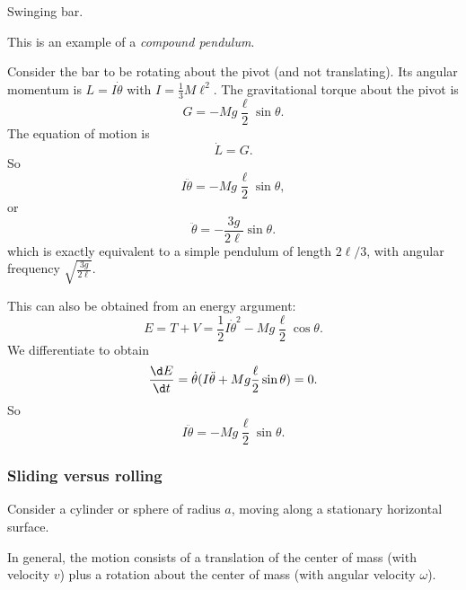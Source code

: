 \documentclass[a4paper]{article}
\begin{document}
\begin{eg}
  Swinging bar.
  \begin{center}
  \end{center}
  This is an example of a \emph{compound pendulum}.

  Consider the bar to be rotating about the pivot (and not translating). Its angular momentum is $L = I\dot{\theta}$ with $I = \frac{1}{3}M\ell^2$. The gravitational torque about the pivot is
  \[
    G = - Mg\frac{\ell}{2} \sin \theta.
  \]
  The equation of motion is
  \[
    \dot{L} = G.
  \]
  So
  \[
    I\ddot{\theta} = -Mg \frac{\ell}{2}\sin \theta,
  \]
  or
  \[
    \ddot{\theta} = -\frac{3g}{2\ell} \sin \theta.
  \]
  which is exactly equivalent to a simple pendulum of length $2\ell/3$, with angular frequency $\sqrt{\frac{3g}{2\ell}}$.

  This can also be obtained from an energy argument:
  \[
    E = T + V = \frac{1}{2}I\dot{\theta}^2 - Mg\frac{\ell}{2}\cos\theta.
  \]
  We differentiate to obtain
  \[
    \frac{\d E}{\d t} = \dot{\theta}(I\ddot{\theta} + Mg \frac{\ell}{2}\sin \theta) = 0.
  \]
  So
  \[
    I\ddot{\theta} = -Mg \frac{\ell}{2}\sin \theta.
  \]
\end{eg}

\subsubsection*{Sliding versus rolling}
Consider a cylinder or sphere of radius $a$, moving along a stationary horizontal surface.
\begin{center}
\end{center}
In general, the motion consists of a translation of the center of mass (with velocity $v$) plus a rotation about the center of mass (with angular velocity $\omega$).
\end{document}
